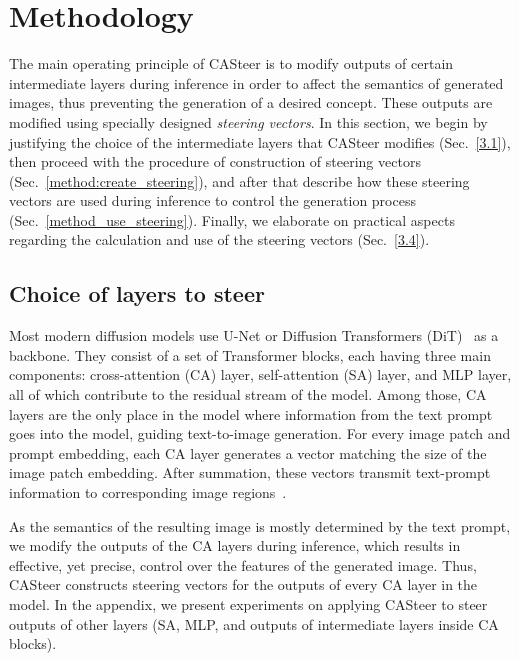 \section{Methodology}
\label{sec:method}


The main operating principle of CASteer is to modify outputs of certain intermediate layers during inference in order to affect the semantics of generated images, thus preventing the generation of a desired concept. These outputs are modified using specially designed \textit{steering vectors}. In this section, we begin by justifying the choice of the intermediate layers that CASteer modifies (Sec.~\ref{3.1}), then proceed with the procedure of construction of steering vectors (Sec.~\ref{method:create_steering}), and after that describe how these steering vectors are used during inference to control the generation process (Sec.~\ref{method_use_steering}). Finally, we elaborate on practical aspects regarding the calculation and use of the steering vectors (Sec.~\ref{3.4}).
\vspace{-0.1cm}
\subsection{Choice of layers to steer}
\vspace{-0.1cm}
\label{3.1}

Most modern diffusion models use U-Net or Diffusion Transformers (DiT)~\cite{DBLP:conf/iccv/PeeblesX23} as a backbone. They  consist of a set of Transformer blocks, each having three main components: cross-attention (CA) layer, self-attention (SA) layer, and MLP layer, all of which contribute to the residual stream of the model. Among those, CA layers are the only place in the model where information from the text prompt goes into the model, guiding text-to-image generation. For every image patch and prompt embedding, each CA layer generates a vector matching the size of the image patch embedding. After summation, these vectors transmit text-prompt information to corresponding image regions~\cite{DBLP:conf/iclr/HertzMTAPC23}.

As the semantics of the resulting image is mostly determined by the text prompt, we modify the outputs of the CA layers during inference, which results in effective, yet precise, control over the features of the generated image. Thus, CASteer constructs steering vectors for the outputs of every CA layer in the model. 
%
In the appendix, we present experiments on applying CASteer to steer outputs of other layers (SA, MLP, and outputs of intermediate layers inside CA blocks).%
%
\vspace{-0.1cm}
